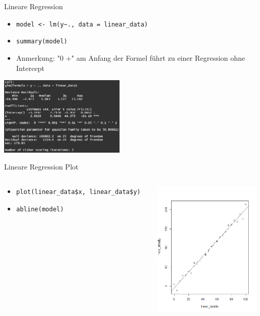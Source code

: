 \documentclass[xcolor=dvipsnames, aspectratio = 169]{beamer}
\begin{document}
\begin{frame}[fragile]{Lineare Regression}
	\begin{itemize}
		\item \verb+model <- lm(y~., data = linear_data)+
		\item \verb+summary(model)+
		\item Anmerkung: "0 +" am Anfang der Formel führt zu einer Regression ohne Intercept 
	\end{itemize}
			
	\begin{center}
		\includegraphics[height=3.75cm]{LinearRegressionSummary}
	\end{center}
\end{frame}

\begin{frame}[fragile]{Lineare Regression Plot}
	\begin{columns}[T]
		\begin{column}{0.6\textwidth}
			\begin{itemize}
				\item \verb+plot(linear_data$x, linear_data$y)+
				\item \verb+abline(model)+
			\end{itemize}
		\end{column}
		\begin{column}{0.4\textwidth}
			\includegraphics[height=6.5cm]{LinearRegressionPlot}
		\end{column}
	\end{columns}
\end{frame}
\end{document}
